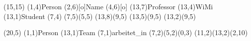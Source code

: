 \documentclass[11pt,a4paper]{article}
\begin{document}
\setlength{\unitlength}{.6cm}
\begin{schema}(15,15)
  \entity(1,4){Person}
  \attr(2,6)[o]{Name}
  \attr(4,6)[o]{}
  \relation(13,7){Professor}
  \relation(13,4){WiMi}
  \relation(13,1){Student}
  \cluster(7,4){}
  \connection(7,5)(5,5){}
  \connection(13,8)(9,5){}
  \connection(13,5)(9,5){}
  \connection(13,2)(9,5){}
\end{schema}


\begin{schema}(20,5)
  \entity(1,1){Person}
  \entity(13,1){Team}
  \relation(7,1){arbeitet\_in}
  \connection(7,2)(5,2){(0,3)}
  \connection(11,2)(13,2){(2,10)}
\end{schema}
\end{document}
